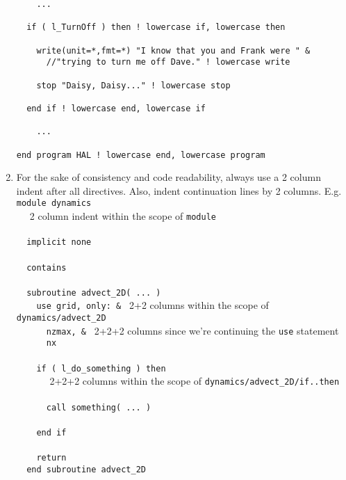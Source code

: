 \documentclass[letterpaper,12pt]{article}
\begin{document}
\begin{enumerate}
\begin{verbatim}
    ... 

  if ( l_TurnOff ) then ! lowercase if, lowercase then

    write(unit=*,fmt=*) "I know that you and Frank were " &
      //"trying to turn me off Dave." ! lowercase write

    stop "Daisy, Daisy..." ! lowercase stop

  end if ! lowercase end, lowercase if

    ...

end program HAL ! lowercase end, lowercase program 
\end{verbatim}

\item For the sake of consistency and code readability, always use a 2 column 
indent after all directives. Also, indent continuation lines by 2 columns. \newline
E.g. \\
\verb|module dynamics| \\
\verb*|  | {\small 2 column indent within the scope of \texttt{module}} \\
\verb|| \\
\verb*|  implicit|\verb| none| \\
\verb|| \\
\verb*|  contains| \\
\verb|| \\
\verb*|  subroutine|\verb| advect_2D( ... )| \\
\verb*|    use|\verb| grid, only: & | {\small 2+2 columns within the scope of \texttt{dynamics/advect\_2D}} \\
\verb*|      nzmax,|\verb| & | {\small 2+2+2 columns since we're continuing the \texttt{use} statement}  \\
\verb*|      nx| \\
\verb|| \\
\verb*|    if|\verb| ( l_do_something ) then| \\
\verb*|      | {\small 2+2+2 columns within the scope of \texttt{dynamics/advect\_2D/if..then}} \\
\verb|| \\
\verb*|      |\verb|call something( ... )| \\
\verb|| \\
\verb*|    end|\verb| if| \\
\verb|| \\
\verb*|    return| \\
\verb*|  end|\verb| subroutine advect_2D| \\


\end{enumerate}
\end{document}
